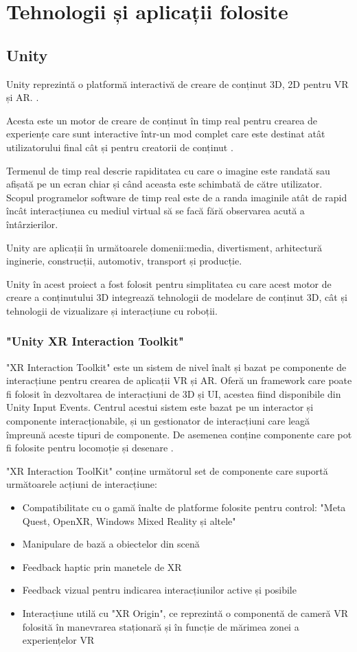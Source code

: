 \section{Tehnologii și aplicații folosite}
\subsection{Unity}
Unity reprezintă o platformă interactivă de creare de conținut 3D,  2D pentru VR și AR. \cite{unity}.

Acesta este un motor de creare de conținut în timp real pentru crearea de experiențe care sunt interactive într-un mod complet care este destinat atât utilizatorului final cât și pentru creatorii de conținut \cite{unity}.

Termenul de timp real descrie rapiditatea cu care o imagine este randată sau afișată pe un ecran chiar și când aceasta este schimbată de către utilizator. Scopul programelor software de timp real este de a randa imaginile atât de rapid încât interacțiunea cu mediul virtual să se facă fără observarea acută a întârzierilor\cite{unity}.

Unity are aplicații în următoarele domenii:media, divertisment, arhitectură
inginerie, construcții, automotiv, transport și producție\cite{unity}.

Unity în acest proiect a fost folosit pentru simplitatea cu care acest motor de creare a conținutului 3D integrează tehnologii de modelare de conținut 3D, cât și tehnologii de vizualizare și interacțiune cu roboții\cite{unity}.

\subsubsection{"Unity XR Interaction Toolkit"}
"XR Interaction Toolkit" este un sistem de nivel înalt și bazat pe componente de interacțiune pentru crearea de aplicații VR și AR. Oferă un framework care poate fi folosit în dezvoltarea de interacțiuni de 3D și UI, acestea fiind disponibile din Unity Input Events. Centrul acestui sistem este bazat pe un interactor și componente interacționabile, și un gestionator de interacțiuni care leagă împreună aceste tipuri de componente. De asemenea conține componente care pot fi folosite pentru locomoție și desenare \cite{XRI}.

"XR Interaction ToolKit" conține următorul set de componente care suportă următoarele acțiuni de interacțiune:
\begin{itemize}
	\item Compatibilitate cu o gamă înalte de platforme folosite pentru control: "Meta Quest, OpenXR, Windows Mixed Reality și altele" \cite{XRI}
	\item Manipulare de bază a obiectelor din scenă \cite{XRI}
	\item Feedback haptic prin manetele de XR \cite{XRI}
	\item Feedback vizual pentru indicarea interacțiunilor active și posibile \cite{XRI}
	\item Interacțiune utilă cu "XR Origin", ce reprezintă o componentă de cameră VR folosită în manevrarea staționară și în funcție de mărimea zonei a experiențelor VR \cite{XRI}
\end{itemize}

